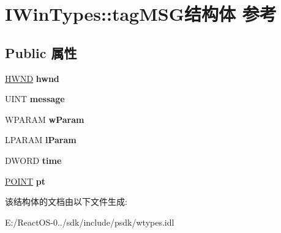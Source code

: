 \hypertarget{struct_i_win_types_1_1tag_m_s_g}{}\section{I\+Win\+Types\+:\+:tag\+M\+S\+G结构体 参考}
\label{struct_i_win_types_1_1tag_m_s_g}
\subsection*{Public 属性}
\begin{DoxyCompactItemize}
\item 
\mbox{\label{struct_i_win_types_1_1tag_m_s_g_a407d563b4eae0742b55dad0440bbef92}} 
\hyperlink{interfacevoid}{H\+W\+ND} {\bfseries hwnd}
\item 
\mbox{\label{struct_i_win_types_1_1tag_m_s_g_a3445328423c2b8ba281e33e144963778}} 
U\+I\+NT {\bfseries message}
\item 
\mbox{\label{struct_i_win_types_1_1tag_m_s_g_af38ac17e23045402e53a4086a9f390b7}} 
W\+P\+A\+R\+AM {\bfseries w\+Param}
\item 
\mbox{\label{struct_i_win_types_1_1tag_m_s_g_a5f7d1e1f481175d9022fa56a72508ae7}} 
L\+P\+A\+R\+AM {\bfseries l\+Param}
\item 
\mbox{\label{struct_i_win_types_1_1tag_m_s_g_a92de003d9d3ccd0bc977a53f37ed2eb4}} 
D\+W\+O\+RD {\bfseries time}
\item 
\mbox{\label{struct_i_win_types_1_1tag_m_s_g_ae4f6597bae77082bde6b963a72a9efb4}} 
\hyperlink{struct_i_win_types_1_1tag_p_o_i_n_t}{P\+O\+I\+NT} {\bfseries pt}
\end{DoxyCompactItemize}


该结构体的文档由以下文件生成\+:\begin{DoxyCompactItemize}
\item 
E\+:/\+React\+O\+S-\/0../sdk/include/psdk/wtypes.\+idl\end{DoxyCompactItemize}
